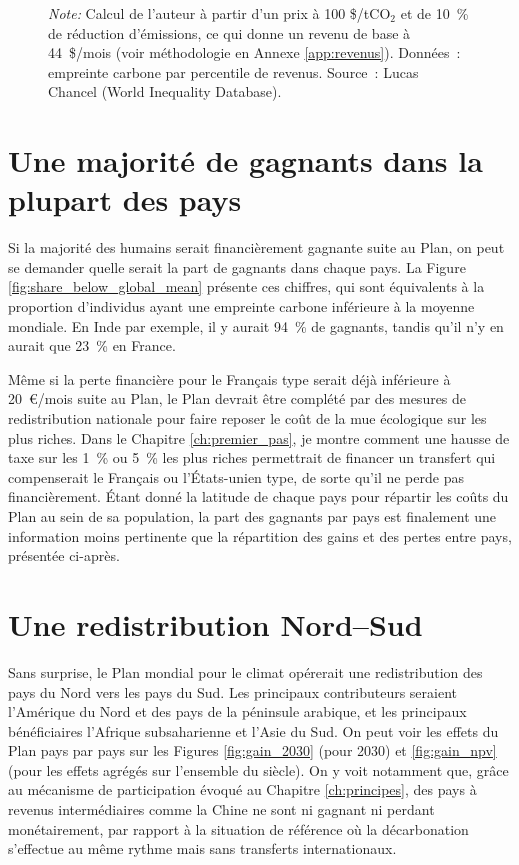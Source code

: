 \documentclass[a5paper,french,openany]{memoir}
\begin{document}
\begin{figure}[h!]
\begin{subfigure}{.5\textwidth}
\end{subfigure}
{\footnotesize \textit{Note:} Calcul de l'auteur à partir d'un prix à 100 \$/tCO$_\text{2}$ et de 10~\% de réduction d'émissions, ce qui donne un revenu de base à 44~\$/mois (voir méthodologie en Annexe \ref{app:revenus}). Données~: empreinte carbone par percentile de revenus. Source~: Lucas Chancel (World Inequality Database).}
\end{figure}

\section{Une majorité de gagnants dans la plupart des pays}

Si la majorité des humains serait financièrement gagnante suite au Plan, on peut se demander quelle serait la part de gagnants dans chaque pays. La Figure \ref{fig:share_below_global_mean} présente ces chiffres, qui sont équivalents à la proportion d'individus ayant une empreinte carbone inférieure à la moyenne mondiale. En Inde par exemple, il y aurait 94~\% de gagnants, tandis qu'il n'y en aurait que 23~\% en France.  

Même si la perte financière pour le Français type serait déjà inférieure à 20~\euro{}/mois suite au Plan, le Plan devrait être complété par des mesures de redistribution nationale pour faire reposer le coût de la mue écologique sur les plus riches. Dans le Chapitre \ref{ch:premier_pas}, je montre comment une hausse de taxe sur les 1~\% ou 5~\% les plus riches permettrait de financer un transfert qui compenserait le Français ou l'États-unien type, de sorte qu'il ne perde pas financièrement. Étant donné la latitude de chaque pays pour répartir les coûts du Plan au sein de sa population, la part des gagnants par pays est finalement une information moins pertinente que la répartition des gains et des pertes entre pays, présentée ci-après.


\section{Une redistribution Nord--Sud}

Sans surprise, le Plan mondial pour le climat opérerait une redistribution des pays du Nord vers les pays du Sud. Les principaux contributeurs seraient l'Amérique du Nord et des pays de la péninsule arabique, et les principaux bénéficiaires l'Afrique subsaharienne et l'Asie du Sud. On peut voir les effets du Plan pays par pays sur les Figures \ref{fig:gain_2030} (pour 2030) et \ref{fig:gain_npv} (pour les effets agrégés sur l'ensemble du siècle). On y voit notamment que, grâce au mécanisme de participation évoqué au Chapitre \ref{ch:principes}, des pays à revenus intermédiaires comme la Chine ne sont ni gagnant ni perdant monétairement, par rapport à la situation de référence où la décarbonation s'effectue au même rythme mais sans transferts internationaux. 
\end{document}
